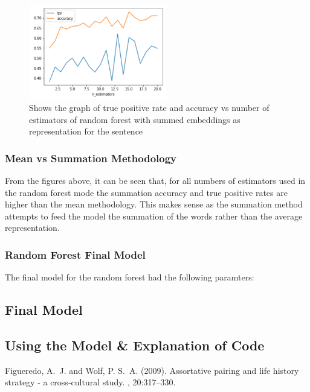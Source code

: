 \documentclass[twoside,twocolumn]{article}
\begin{document}
\begin{figure}[H]
\includegraphics[width=6cm]{randForest_estimators_meaned_graph-tpr}
\centering
\caption{Shows the graph of true positive rate and accuracy vs number of estimators of random forest 
with summed embeddings as representation for the sentence}
\end{figure}


\subsubsection{Mean vs Summation Methodology}

From the figures above, it can be seen that, for all numbers of estimators used in the
random forest mode the summation accuracy and true positive rates are higher than the mean
methodology. This makes sense as the summation method attempts to feed the model the summation
of the words rather than the average representation.

\subsubsection{Random Forest Final Model}

The final model for the random forest had the following paramters:

\subsection{Final Model}

\subsection{Using the Model & Explanation of Code}



\begin{thebibliography}{99} %

Figueredo, A.~J. and Wolf, P. S.~A. (2009).
\newblock Assortative pairing and life history strategy - a cross-cultural
  study.
, 20:317--330.
 
\end{thebibliography}

\end{document}

